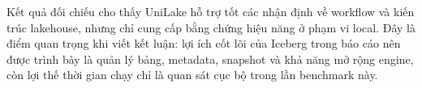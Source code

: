 Kết quả đối chiếu cho thấy UniLake hỗ trợ tốt các nhận định về workflow và kiến trúc lakehouse, nhưng chỉ cung cấp bằng chứng hiệu năng ở phạm vi local. Đây là điểm quan trọng khi viết kết luận: lợi ích cốt lõi của Iceberg trong báo cáo nên được trình bày là quản lý bảng, metadata, snapshot và khả năng mở rộng engine, còn lợi thế thời gian chạy chỉ là quan sát cục bộ trong lần benchmark này.
